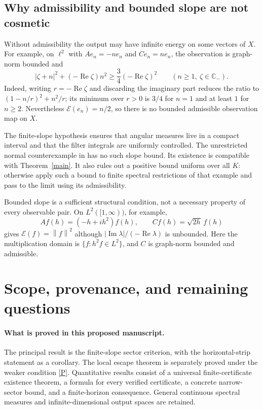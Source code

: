 \documentclass[11pt,a4paper]{article}
\theoremstyle{definition}\newtheorem{definition}[theorem]{Definition}
\theoremstyle{remark}\newtheorem{remark}[theorem]{Remark}
\newcommand{\C}{\mathbb C}\newcommand{\R}{\mathbb R}\newcommand{\N}{\mathbb N}
\newcommand{\E}{\mathcal E}\newcommand{\D}{\mathcal D}
\DeclareMathOperator{\Rea}{Re}\DeclareMathOperator{\Ima}{Im}
\newcommand{\norm}[1]{\left\lVert #1\right\rVert}
\begin{document}
\subsection{Why admissibility and bounded slope are not cosmetic}
Without admissibility the output may have infinite energy on some vectors of $X$. For example, on $\ell^2$ with $Ae_n=-ne_n$ and $Ce_n=ne_n$, the observation is graph-norm bounded and
\[
 |\zeta+n|^2+(-\Rea\zeta)n^2\ge\frac34(-\Rea\zeta)^2
 \qquad(n\ge1,\ \zeta\in\C_-).
\]
Indeed, writing $r=-\Rea\zeta$ and discarding the imaginary part reduces the ratio to
$(1-n/r)^2+n^2/r$; its minimum over $r>0$ is $3/4$ for $n=1$ and at least $1$ for $n\ge2$. Nevertheless $\E(e_n)=n/2$, so there is no bounded admissible observation map on $X$.

The finite-slope hypothesis ensures that angular measures live in a compact interval and that the filter integrals are uniformly controlled. The unrestricted normal counterexample in \cite{DJ26} has no such slope bound. Its existence is compatible with Theorem~\ref{main}. It also rules out a positive bound uniform over all $K$: otherwise apply such a bound to finite spectral restrictions of that example and pass to the limit using its admissibility.

Bounded slope is a sufficient structural condition, not a necessary property of every observable pair. On $L^2([1,\infty))$, for example,
\[
 Af(h)=(-h+ih^2)f(h),\qquad Cf(h)=\sqrt{2h}\,f(h)
\]
gives $\E(f)=\norm{f}^2$ although $|\Ima\lambda|/(-\Rea\lambda)$ is unbounded. Here the multiplication domain is $\{f:h^2f\in L^2\}$, and $C$ is graph-norm bounded and admissible.

\section{Scope, provenance, and remaining questions}\label{sec:scope}
\paragraph{What is proved in this proposed manuscript.}
The principal result is the finite-slope sector criterion, with the horizontal-strip statement as a corollary. The local escape theorem is separately proved under the weaker condition \eqref{P}. Quantitative results consist of a universal finite-certificate existence theorem, a formula for every verified certificate, a concrete narrow-sector bound, and a finite-horizon consequence. General continuous spectral measures and infinite-dimensional output spaces are retained.
\end{document}
